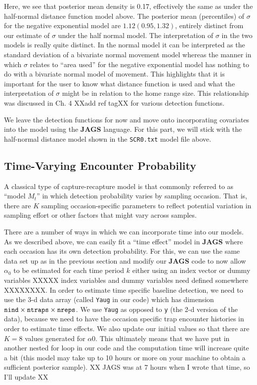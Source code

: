 Here, we see that posterior mean density is 0.17,
effectively the same as under the half-normal distance function model
above.  The posterior mean (percentiles) of $\sigma$ for the negative
exponential model are $1.12 (0.95, 1.32)$, entirely distinct from our
estimate of $\sigma$ under the half normal model. The interpretation
of $\sigma$ in the two models is really quite distinct. In the normal
model it can be interpreted as the standard deviation of a bivariate
normal movement model whereas the manner in which $\sigma$ relates to
``area used'' for the negative exponential model has nothing to do
with a bivariate normal model of movement.  This highlights that it is
important for the user to know what distance function is used and what
the interpretation of $\sigma$ might be in relation to the home range size.
This relationship was discussed in Ch. 4 
XXadd ref tagXX for various detection functions. 


We leave the detection functions for now and move onto incorporating
covariates into the model using the {\bf JAGS} 
language.  For this part, we will stick with the half-normal distance
model shown in the \mbox{\tt SCR0.txt} model file above. 

\subsection{Time-Varying Encounter Probability}

A classical type of capture-recapture model is that commonly referred
to as ``model $M_{t}$'' \citep{otis_etal:1978} in which detection probability varies by
sampling occasion. That is, there are $K$ sampling occasion-specific
parameters to reflect potential variation in sampling effort or other
factors that might vary across samples.

There are a number of ways in which we can incorporate time into our
models.  As we described above, we can easily fit a ``time effect'' model in {\bf JAGS}
where each occasion has its own detection probability.
For this, we can use the same data set up as in the previous
section and modify our {\bf JAGS} code to now allow $\alpha_0$ to be
estimated for each time period $k$ either using an index vector or
dummy variables XXXXX index variables and dummy variables need defined
somewhere XXXXXXXX.  In order to estimate time
specific baseline detection, we need to use the 3-d data array (called \mbox{\tt Yaug} in our
code) which
has dimension
$\mbox{\tt nind} \times \mbox{\tt ntraps} \times \mbox{\tt nreps}$.
We use \mbox{\tt Yaug} as opposed to \mbox{\tt y} (the 2-d version of the data),
 because we need to have the occasion specific trap 
encounter histories in order to estimate time effects.  
We also update our
initial values so that there are $K=8$ values generated for $\alpha0$. This
ultimately means that we have put in another nested for loop in our
code and the computation time will increase quite a bit (this model
may take up to 10 hours or more on your machine to obtain a sufficient
posterior sample).   XX JAGS was at 7 hours when I wrote that time, so I'll update XX

